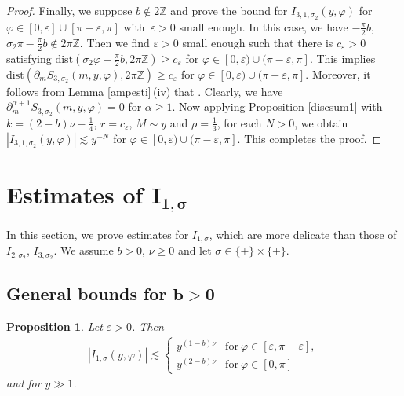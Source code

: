 \documentclass[10pt,a4paper]{article}
\numberwithin{equation}{section}
\newtheorem{Proposition}[Theorem]{Proposition}
 { \theoremstyle{definition}
\newtheorem{Definition}[Theorem]{Definition}
\newtheorem{Note}[Theorem]{Note}
\newtheorem{Example}[Theorem]{Example}
\newtheorem{Remark}[Theorem]{Remark} }
\def\a{\alpha}
\def\e{\varepsilon}
\def\f{\varphi}
\def\n{\nu}
\def\s{\sigma}
\def\z{\zeta}
\def\pa{\partial}
\begin{document}
\begin{proof}
Finally, we suppose $b\notin 2\mathbb{Z}$ and prove the bound for $I_{3,1,\s_2}(y,\f)$ for $\f\in [0,\e]\cup [\pi-\e,\pi]$ with~${\e>0}$ small enough. In this case, we have
$
-\frac{\pi}{2}b$, $ \s_2\pi-\frac{\pi}{2}b\notin 2\pi \mathbb{Z}$.
Then we find $\e>0$ small enough such that there is $c_{\e}>0$ satisfying $\mathrm{dist}(\s_2\f-\frac{\pi}{2}b,2\pi\mathbb{Z})\geq c_{\e}$ for $\f\in [0,\e)\cup (\pi-\e,\pi]$. This implies $\mathrm{dist}(\pa_mS_{3,\s_2}(m,y,\f), 2\pi\mathbb{Z})\geq c_{\e}$ for $\f\in [0,\e)\cup (\pi-\e,\pi]$. Moreover, it follows from Lemma \ref{ampesti}\,(iv) that \smash{$|\pa_{m}^{\a}\z_{3,1,\s_2}(m,y,\f)|\lesssim y^{(2-b)\n-\frac{1}{4}-\frac{\a}{3}}$}. Clearly, we have $\pa_m^{\a+1}S_{3,\s_2}(m,y,\f)=0$ for $\a\geq 1$.
Now applying Proposition \ref{discsum1} with $k=(2-b)\n-\frac{1}{4}$, $r=c_{\e}$, $M\sim y$ and $\rho=\frac{1}{3}$, for each $N>0$, we obtain
$
|I_{3,1,\s_2}(y,\f)|\lesssim y^{-N}$ for $\f\in [0,\e)\cup (\pi-\e,\pi]$.
This completes the proof.
\end{proof}

\section[Estimates of I\_\{1,s\}]{Estimates of $\boldsymbol{ I_{1,\s}}$}


In this section, we prove estimates for $I_{1,\s}$, which are more delicate than those of $I_{2,\s_2}$, $I_{3,\s_2}$.
We assume $b>0$, $\n\geq 0$ and let $\s\in \{\pm\}\times \{\pm\}$.

\subsection[General bounds for b>0]{General bounds for $\boldsymbol{b>0}$}

\begin{Proposition}\label{I_1prop}
Let $\e>0$. Then
\begin{align*}
|I_{1,\s}(y,\f)|\lesssim \begin{cases}
y^{(1-b)\n}& \text{for}\  \f\in [\e,\pi-\e], \\
y^{(2-b)\n}& \text{for}\  \f\in [0,\pi]
\end{cases}
\end{align*}
and for $y\gg 1$.
\end{Proposition}
\end{document}
